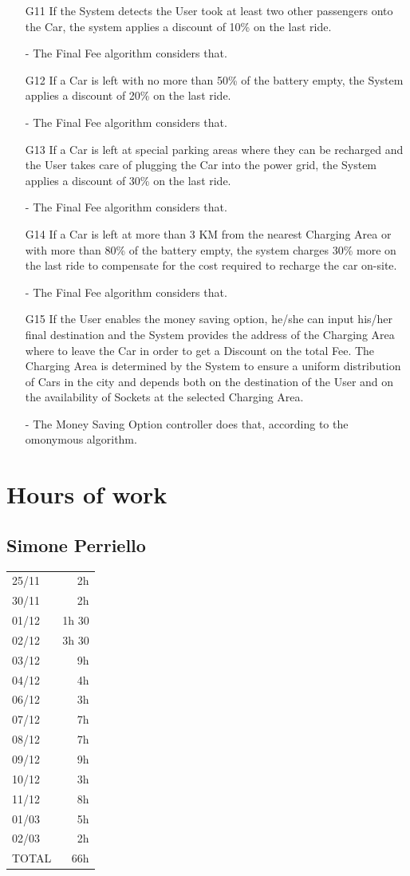 \documentclass[12pt]{article}
\begin{document}
\begin{enumerate}
	\item[G11] If the System detects the User took at least two other passengers onto the Car, the system applies a discount of 10\% on the last ride.
	\item[-] The Final Fee algorithm considers that.
	\item[G12] If a Car is left with no more than 50\% of the battery empty, the System applies a discount of 20\% on the last ride.
	\item[-] The Final Fee algorithm considers that.
	\item[G13] If a Car is left at special parking areas where they can be recharged and the User takes care of plugging the Car into the power grid, the System applies a discount of 30\% on the last ride.
	\item[-] The Final Fee algorithm considers that.
	\item[G14] If a Car is left at more than 3 KM from the nearest Charging Area or with more than 80\% of the battery empty, the system charges 30\% more on the last ride to compensate for the cost required to recharge the car on-site.
	\item[-] The Final Fee algorithm considers that.
	\item[G15] If the User enables the money saving option, he/she can input his/her final destination and the System provides the address of the Charging Area where to leave the Car in order to get a Discount on the total Fee. The Charging Area is determined by the System to ensure a uniform distribution of Cars in the city and depends both on the destination of the User and on the availability of Sockets at the selected Charging Area.
	\item[-] The Money Saving Option controller does that, according to the omonymous algorithm.
\end{enumerate}

\clearpage
\section{Hours of work}
\subsection{Simone Perriello}
\begin{tabular}{l r}
25/11 & 2h\\
30/11 & 2h\\
01/12 & 1h 30\\
02/12 & 3h 30\\
03/12 & 9h\\
04/12 & 4h\\
06/12 & 3h\\
07/12 & 7h\\
08/12 & 7h\\
09/12 & 9h\\
10/12 & 3h\\
11/12 & 8h\\ \hline
01/03 & 5h\\ \hline
02/03 & 2h\\ \hline
TOTAL & 66h\\
\end{tabular}
\end{document}
